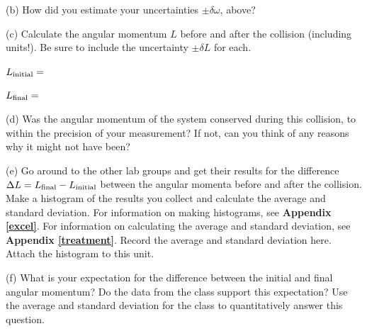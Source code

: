 (b) How did you estimate your uncertainties $\pm \delta \omega$, above?
\answerspace{1 in}

(c) Calculate the angular momentum $L$ before and after the collision (including units!).  Be sure to include the uncertainty $\pm\delta L$ for each.

\medskip
\hspace{0.5in} $L_{\rm initial} =$
\answerspace{0.6in}

\hspace{0.5in} $L_{\rm final} =$
\answerspace{0.6in}

(d) Was the angular momentum of the system conserved during this collision, to within the precision of your measurement?  If not, can you think of any reasons why it might not have been?
\answerspace{0.6in}

(e) Go around to the other lab groups and get their results for the difference $\Delta L= L_{\rm final} - L_{\rm initial}$ between the angular momenta before and after the collision. Make a histogram of the results you collect and calculate the average and standard deviation. For information on making histograms, see \textbf{Appendix \ref{excel}}. For information on calculating the average and standard deviation, see \textbf{Appendix \ref{treatment}}. Record the average and standard deviation here. Attach the histogram to this unit.                                                           
\vspace{25mm}                                                                                                                                
                                                                                                                                                                                                                                                                                          
(f) What is your expectation for the difference between the initial and final angular momentum? Do the data from the class support this expectation? Use the average and standard deviation for the class to quantitatively answer this question.                                                 
\vspace{25mm}                                                                                                                                
                                                                                                                                             
